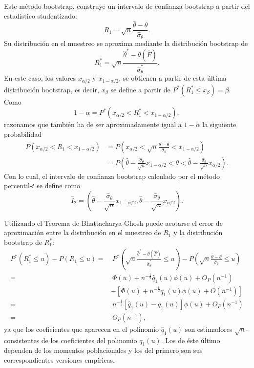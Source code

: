 \documentclass[
]{book}
\theoremstyle{break}
\theoremstyle{nonumberplain}
\begin{document}
Este método bootstrap, construye un intervalo de confianza bootstrap a
partir del estadístico studentizado:
\[R_1=\sqrt{n}\frac{\hat{\theta}-\theta }{\hat{\sigma}_{\theta }}.\]
Su distribución en el muestreo se aproxima mediante la distribución
bootstrap de
\[R_1^{\ast}=\sqrt{n}\frac{\hat{\theta}^{\ast}-\theta \left( \hat{F}
 \right)}{\hat{\sigma}_{\theta }^{\ast}}.\]
En este caso, los valores \(x_{\alpha /2}\) y
\(x_{1-\alpha /2}\), se obtienen a partir de esta última distribución
bootstrap, es decir, \(x_{\beta }\) se define a partir de \(P^{\ast}\left(
R_1^{\ast}\leq x_{\beta } \right) =\beta\).
Como
\[1-\alpha =P^{\ast}\left( x_{\alpha /2}<R_1^{\ast}<x_{1-\alpha /2} \right),\]
razonamos que también ha de ser aproximadamente igual a \(1-\alpha\) la
siguiente probabilidad
\[\begin{aligned}
P\left( x_{\alpha /2}<R_1<x_{1-\alpha /2} \right) &= P\left( x_{\alpha /2}<
\sqrt{n}\frac{\hat{\theta}-\theta }{\hat{\sigma}_{\theta }}<x_{1-\alpha
/2} \right) \\
&= P\left( \hat{\theta}-\frac{\hat{\sigma}_{\theta }}{\sqrt{n}}x_{1-\alpha
/2}<\theta <\hat{\theta}-\frac{\hat{\sigma}_{\theta }}{\sqrt{n}}x_{\alpha
/2} \right).
\end{aligned}\]
Con lo cual, el intervalo de confianza bootstrap calculado
por el método percentil-\(t\) se define como
\[\hat{I}_2=\left( \hat{\theta}-\frac{\hat{\sigma}_{\theta }}{\sqrt{n}}
x_{1-\alpha /2},\hat{\theta}-\frac{\hat{\sigma}_{\theta }}{\sqrt{n}}
x_{\alpha /2} \right).\]

Utilizando el Teorema de Bhattacharya-Ghosh puede acotarse el error de
aproximación entre la distribución en el muestreo de \(R_1\) y la
distribución bootstrap de \(R_1^{\ast}\):
\[\begin{aligned}
P^{\ast}\left( R_1^{\ast}\leq u \right) -P\left( R_1\leq u \right)
=&\ P^{\ast}\left( \sqrt{n}\frac{\hat{\theta}^{\ast}-\theta \left( \hat{F}
 \right)}{\hat{\sigma}_{\theta }^{\ast}}\leq u \right)-P\left( \sqrt{n}
\frac{\hat{\theta}-\theta }{\hat{\sigma}_{\theta }}\leq u \right)  \\
=&\  \Phi \left( u \right) +n^{-\frac{1}{2}}\hat{q}_1\left( u \right) \phi
\left( u \right) +O_{P}\left( n^{-1} \right) \\
&-\left[ \Phi \left( u \right) +n^{-\frac{1}{2}}q_1\left( u \right) \phi
\left( u \right) +O\left( n^{-1} \right) \right] \\
=&\  n^{-\frac{1}{2}}\left[ \hat{q}_1\left( u \right) -q_1\left( u \right) 
\right] \phi \left( u \right) +O_{P}\left( n^{-1} \right) \\
=&\ O_{P}\left( n^{-1} \right),
\end{aligned}\]
ya que los coeficientes que aparecen en el polinomio \(\hat{q}_1\left(
u \right)\) son estimadores \(\sqrt{n}\)-consistentes de los coeficientes
del polinomio \(q_1\left( u \right)\). Los de éste último dependen de
los momentos poblacionales y los del primero son sus correspondientes
versiones empíricas.
\end{document}

